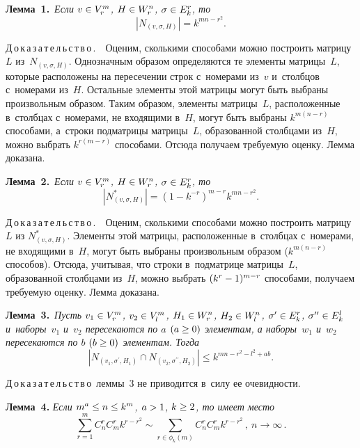 \begin{multicols}{2}
  \smallskip
  
  \noindent
  \textbf{Лемма~1.}\  \textit{Если $v\hm\in V_r^m$, $H\hm\in W_r^n$, 
$\sigma\hm\in E_k^r$, то}
  $$
  \left\vert N_{(v,\sigma,H)} \right\vert =k^{mn-r^2}.
  $$
  
  \noindent
  Д\,о\,к\,а\,з\,а\,т\,е\,л\,ь\,с\,т\,в\,о\,.\ \  Оценим, сколькими способами 
можно построить матрицу~$L$ из~$N_{(v,\sigma,H)}$. Однозначным образом 
определяются те элементы мат\-ри\-цы~$L$, которые расположены на 
пересечении строк с~номерами из~$v$ и~столбцов с~номерами из~$H$. 
Остальные элементы этой матрицы могут быть выбраны произвольным 
образом. Таким образом, элементы матрицы~$L$, расположенные в~столбцах 
с~номерами, не входящими в~$H$, могут быть выбраны $k^{m(n-r)}$ 
способами, а~строки подматрицы матрицы~$L$, образованной столбцами 
из~$H$, можно выбрать $k^{r(m-r)}$ способами. Отсюда получаем требуемую 
оценку. Лемма доказана.
  
  \smallskip
  
  \noindent
  \textbf{Лемма~2.}\ \textit{Если $v\hm\in V_r^m$, $H\hm\in W_r^n$, $\sigma 
\hm\in E_k^r$, то}
  $$
  \left\vert N^*_{(v,\sigma, H)} \right\vert = \left(1-k^{-r}\right)^{m-r} k^{mn-r^2}.
  $$
  
  \noindent
  Д\,о\,к\,а\,з\,а\,т\,е\,л\,ь\,с\,т\,в\,о\,.\ \ Оценим, сколькими способами 
можно построить матрицу~$L$ из $N^*_{(v,\sigma,H)}$. Элементы этой 
мат\-ри\-цы, расположенные в~столбцах с~номерами, не входящими в~$H$, могут 
быть выбраны произвольным образом ($k^{m(n-r)}$ способов). Отсюда, 
учитывая, что строки в~под\-мат\-ри\-це мат\-ри\-цы~$L$, образованной столбцами 
из~$H$, можно выбрать $(k^r\hm-1)^{m-r}$ способами, получаем тре\-бу\-емую 
оценку. Лемма доказана.
  
  \smallskip
  
  \noindent
  \textbf{Лемма~3.}\  \textit{Пусть $v_1\hm\in V_r^m$, $v_2\hm\in 
V_l^m$, $H_1\hm\in W_r^n$, $H_2\hm\in W_l^n$, $\sigma^\prime \hm\in E_k^r$, 
$\sigma^{\prime\prime} \hm\in E_k^l$ и~наборы~$v_1$ и~$v_2$ пересекаются по $a$ $(a\hm\geq 
0)$ элементам, а наборы~$w_1$ и~$w_2$ пересекаются по $b$ $(b\hm\geq 0)$ 
элементам. Тогда}
  $$
  \left\vert N_{(v_1,\sigma^\prime, H_1)} \cap N_{(v_2, \sigma^{\prime\prime}, 
H_2)} \right\vert \leq k^{mn-r^2-l^2+ab}.
  $$
  
  \noindent
  Д\,о\,к\,а\,з\,а\,т\,е\,л\,ь\,с\,т\,в\,о\ леммы~3 не приводится в~силу ее 
очевидности.
  
  \smallskip
  
  \noindent
  \textbf{Лемма~4.} \textit{Если $m^a\hm\leq n\hm\leq k^m$, $a\hm>1$, 
$k\hm\geq 2$, то имеет место}
  $$
  \sum\limits^m_{r=1} C_n^r C_m^r k^{r-r^2}\sim \sum\limits_{r\in \phi_k(m)} 
C_n^r C_m^r k^{r-r^2}\,,\ n\to \infty\,.
  $$
  

\end{multicols}
